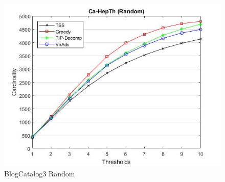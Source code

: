 \begin{figure}
	\centering	
	\includegraphics[scale=0.5]{images/ca-hepthresultrandom.jpg}
	\caption{BlogCatalog3 Random}
\end{figure}

